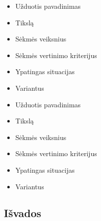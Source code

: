\documentclass[10pt]{IEEEtran}
\begin{document}
            \begin{itemize}
                \item Užduotis pavadinimas
                \begin{itemize}
                \end{itemize}
                \item Tikslą
                \begin{itemize}
                \end{itemize}
                \item Sėkmės veiksnius
                \begin{itemize}
                \end{itemize}
                \item Sėkmės vertinimo kriterijus
                \begin{itemize}
                \end{itemize}
                \item Ypatingas situacijas
                \begin{itemize}
                \end{itemize}
                \item Variantus
                \begin{itemize}
                \end{itemize}
            \end{itemize}

            \begin{itemize}
                \item Užduotis pavadinimas
                \begin{itemize}
                \end{itemize}
                \item Tikslą
                \begin{itemize}
                \end{itemize}
                \item Sėkmės veiksnius
                \begin{itemize}
                \end{itemize}
                \item Sėkmės vertinimo kriterijus
                \begin{itemize}
                \end{itemize}
                \item Ypatingas situacijas
                \begin{itemize}
                \end{itemize}
                \item Variantus
                \begin{itemize}
                \end{itemize}
            \end{itemize}

        \subsection{Išvados}
\end{document}
